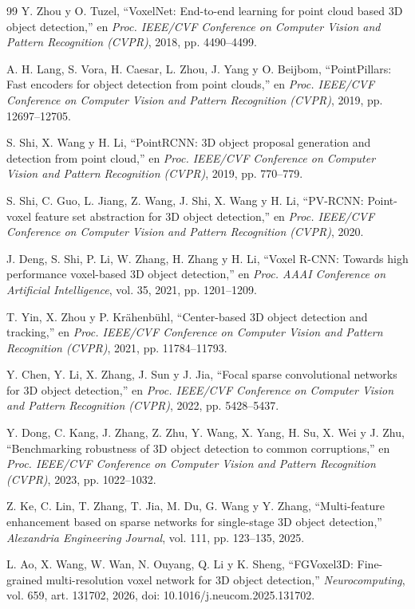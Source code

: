 \documentclass[11pt,letterpaper]{article}
\begin{document}
\begin{thebibliography}{99}
Y. Zhou y O. Tuzel, ``VoxelNet: End-to-end learning for point cloud based 3D object detection,'' en \emph{Proc. IEEE/CVF Conference on Computer Vision and Pattern Recognition (CVPR)}, 2018, pp. 4490--4499.

A. H. Lang, S. Vora, H. Caesar, L. Zhou, J. Yang y O. Beijbom, ``PointPillars: Fast encoders for object detection from point clouds,'' en \emph{Proc. IEEE/CVF Conference on Computer Vision and Pattern Recognition (CVPR)}, 2019, pp. 12697--12705.

S. Shi, X. Wang y H. Li, ``PointRCNN: 3D object proposal generation and detection from point cloud,'' en \emph{Proc. IEEE/CVF Conference on Computer Vision and Pattern Recognition (CVPR)}, 2019, pp. 770--779.

S. Shi, C. Guo, L. Jiang, Z. Wang, J. Shi, X. Wang y H. Li, ``PV-RCNN: Point-voxel feature set abstraction for 3D object detection,'' en \emph{Proc. IEEE/CVF Conference on Computer Vision and Pattern Recognition (CVPR)}, 2020.

J. Deng, S. Shi, P. Li, W. Zhang, H. Zhang y H. Li, ``Voxel R-CNN: Towards high performance voxel-based 3D object detection,'' en \emph{Proc. AAAI Conference on Artificial Intelligence}, vol. 35, 2021, pp. 1201--1209.

T. Yin, X. Zhou y P. Krähenbühl, ``Center-based 3D object detection and tracking,'' en \emph{Proc. IEEE/CVF Conference on Computer Vision and Pattern Recognition (CVPR)}, 2021, pp. 11784--11793.

Y. Chen, Y. Li, X. Zhang, J. Sun y J. Jia, ``Focal sparse convolutional networks for 3D object detection,'' en \emph{Proc. IEEE/CVF Conference on Computer Vision and Pattern Recognition (CVPR)}, 2022, pp. 5428--5437.

Y. Dong, C. Kang, J. Zhang, Z. Zhu, Y. Wang, X. Yang, H. Su, X. Wei y J. Zhu, ``Benchmarking robustness of 3D object detection to common corruptions,'' en \emph{Proc. IEEE/CVF Conference on Computer Vision and Pattern Recognition (CVPR)}, 2023, pp. 1022--1032.

Z. Ke, C. Lin, T. Zhang, T. Jia, M. Du, G. Wang y Y. Zhang, ``Multi-feature enhancement based on sparse networks for single-stage 3D object detection,'' \emph{Alexandria Engineering Journal}, vol. 111, pp. 123--135, 2025.

L. Ao, X. Wang, W. Wan, N. Ouyang, Q. Li y K. Sheng, ``FGVoxel3D: Fine-grained multi-resolution voxel network for 3D object detection,'' \emph{Neurocomputing}, vol. 659, art. 131702, 2026, doi: 10.1016/j.neucom.2025.131702.


\end{thebibliography}
\end{document}
